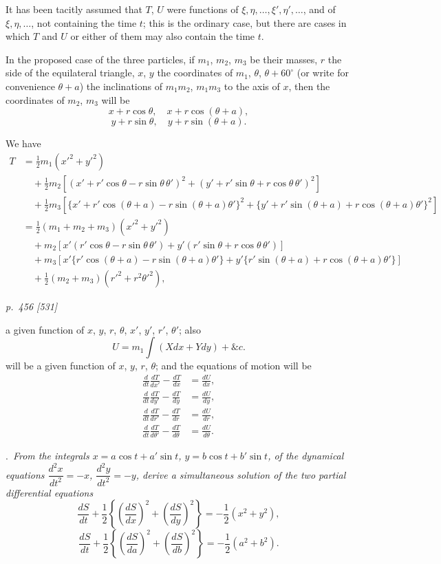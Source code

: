\documentclass[11pt,a4paper]{article}
\theoremstyle{plain}
\theoremstyle{definition}
\begin{document}
It has been tacitly assumed that $T$, $U$ were functions of $\xi,\eta,\ldots,\xi',\eta',\ldots$,
and of $\xi,\eta,\ldots$, not containing the time $t$; this is the ordinary case, but there are
cases in which $T$ and $U$ or either of them may also contain the time $t$.

In the proposed case of the three particles, if $m_1$, $m_2$, $m_3$ be their masses, $r$ the
side of the equilateral triangle, $x$, $y$ the coordinates of $m_1$, $\theta$, $\theta+60^\circ$
(or write for convenience $\theta+a$) the inclinations of $m_1m_2$, $m_1m_3$ to the axis of $x$,
then the coordinates of $m_2$, $m_3$ will be
\[
x+r\cos\theta,\quad x+r\cos(\theta+a),
\]
\[
y+r\sin\theta,\quad y+r\sin(\theta+a).
\]

We have
\begin{align*}
T &= \tfrac12 m_1(x'^2+y'^2)\\
&\quad+\tfrac12 m_2[(x'+r'\cos\theta-r\sin\theta\,\theta')^2
 +(y'+r'\sin\theta+r\cos\theta\,\theta')^2]\\
&\quad+\tfrac12 m_3[\{x'+r'\cos(\theta+a)-r\sin(\theta+a)\theta'\}^2
 +\{y'+r'\sin(\theta+a)+r\cos(\theta+a)\theta'\}^2]\\
&=\tfrac12(m_1+m_2+m_3)(x'^2+y'^2)\\
&\quad+m_2[x'(r'\cos\theta-r\sin\theta\,\theta')+
y'(r'\sin\theta+r\cos\theta\,\theta')]\\
&\quad+m_3[x'\{r'\cos(\theta+a)-r\sin(\theta+a)\theta'\}
+y'\{r'\sin(\theta+a)+r\cos(\theta+a)\theta'\}]\\
&\quad+\tfrac12(m_2+m_3)(r'^2+r^2\theta'^2),
\end{align*}

\clearpage

\bigskip
\textit{p.~456 [531]}
\smallskip

\noindent
a given function of $x$, $y$, $r$, $\theta$, $x'$, $y'$, $r'$, $\theta'$; also
\[
U=m_1\int(Xdx+Ydy)+\&c.
\]
will be a given function of $x$, $y$, $r$, $\theta$; and the equations of motion will be
\begin{align*}
\frac{d}{dt}\frac{dT}{dx'}-\frac{dT}{dx} &= \frac{dU}{dx},\\
\frac{d}{dt}\frac{dT}{dy'}-\frac{dT}{dy} &= \frac{dU}{dy},\\
\frac{d}{dt}\frac{dT}{dr'}-\frac{dT}{dr} &= \frac{dU}{dr},\\
\frac{d}{dt}\frac{dT}{d\theta'}-\frac{dT}{d\theta} &= \frac{dU}{d\theta}.
\end{align*}

\medskip
{}.\ \textit{From the integrals $x = a\cos t + a'\sin t$, $y = b\cos t + b'\sin t$, of the dynamical
equations $\dfrac{d^2x}{dt^2} = -x$, $\dfrac{d^2y}{dt^2} = -y$, derive a simultaneous solution of the two partial differential
equations
\[
\frac{dS}{dt}+\frac12\left\{\left(\frac{dS}{dx}\right)^2+\left(\frac{dS}{dy}\right)^2\right\}
=-\frac12(x^2+y^2),
\]
\[
\frac{dS}{dt}+\frac12\left\{\left(\frac{dS}{da}\right)^2+\left(\frac{dS}{db}\right)^2\right\}
=-\frac12(a^2+b^2).
\]}
\end{document}
